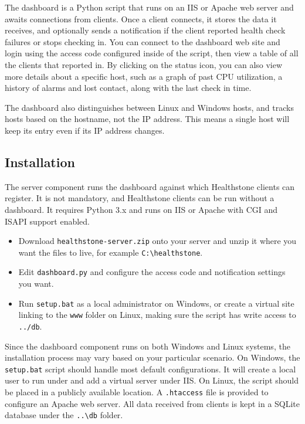 \documentclass[11pt]{article}
\begin{document}
The dashboard is a Python script that runs on an IIS or Apache web server and awaits connections from clients. Once a client connects, it stores the data it receives, and optionally sends a notification if the client reported health check failures or stops checking in. You can connect to the dashboard web site and login using the access code configured inside of the script, then view a table of all the clients that reported in. By clicking on the status icon, you can also view more details about a specific host, such as a graph of past CPU utilization, a history of alarms and lost contact, along with the last check in time.

The dashboard also distinguishes between Linux and Windows hosts, and tracks hosts based on the hostname, not the IP address. This means a single host will keep its entry even if its IP address changes.

\subsection{Installation}

The server component runs the dashboard against which Healthstone clients can register. It is not mandatory, and Healthstone clients can be run without a dashboard. It requires Python 3.x and runs on IIS or Apache with CGI and ISAPI support enabled.

\begin{itemize}
\item Download \texttt{healthstone-server.zip} onto your server and unzip it where you want the files to live, for example \texttt{C:\textbackslash healthstone}.
\item Edit \texttt{dashboard.py} and configure the access code and notification settings you want.
\item Run \texttt{setup.bat} as a local administrator on Windows, or create a virtual site linking to the \texttt{www} folder on Linux, making sure the script has write access to \texttt{../db}.
\end{itemize}

Since the dashboard component runs on both Windows and Linux systems, the installation process may vary based on your particular scenario. On Windows, the \texttt{setup.bat} script should handle most default configurations. It will create a local user to run under and add a virtual server under IIS. On Linux, the script should be placed in a publicly available location. A \texttt{.htaccess} file is provided to configure an Apache web server. All data received from clients is kept in a SQLite database under the \texttt{..\textbackslash db} folder.
\end{document}

